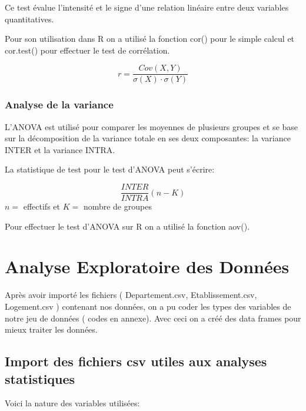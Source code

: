 \documentclass[mstat,12pt]{unswthesis}
\begin{document}
Ce test évalue l'intensité et le signe d'une relation linéaire entre
deux variables quantitatives. \medskip

Pour son utilisation dans R on a utilisé la fonction cor() pour le
simple calcul et cor.test() pour effectuer le test de corrélation.
\medskip

\begin{center} 

$$
r =\frac {{Cov}(X,Y)} {\sigma(X) \cdot \sigma (Y)}
$$

\end{center}
\medskip

\subsection{Analyse de la variance}\label{analyse-de-la-variance}

L'ANOVA est utilisé pour comparer les moyennes de plusieurs groupes et
se base sur la décomposition de la variance totale en ses deux
composantes: la variance INTER et la variance INTRA. \medskip

La statistique de test pour le test d'ANOVA peut s'écrire:

\[
\frac {INTER} {INTRA}  (n-K)
\] \(n=\) effectifs et \(K=\) nombre de groupes

\medskip

Pour effectuer le test d'ANOVA sur R on a utilisé la fonction aov().

\bigskip

\chapter{Analyse Exploratoire des
Données}\label{analyse-exploratoire-des-donnuxe9es}

Après avoir importé les fichiers ( Departement.csv, Etablissement.csv,
Logement.csv ) contenant nos données, on a pu coder les types des
variables de notre jeu de données ( codes en annexe). Avec ceci on a
créé des data frames pour mieux traiter les données.

\bigskip

\section{Import des fichiers csv utiles aux analyses
statistiques}\label{import-des-fichiers-csv-utiles-aux-analyses-statistiques}

Voici la nature des variables utilisées:
\end{document}

